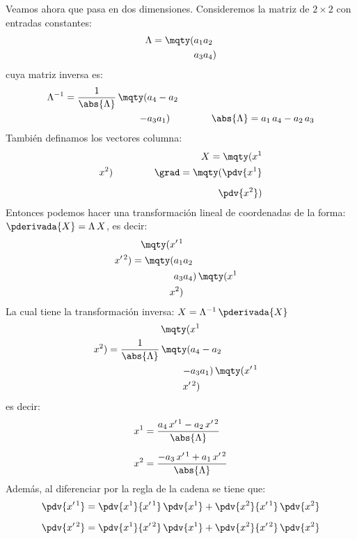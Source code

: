 Veamos ahora que pasa en dos dimensiones. Consideremos la matriz de $2 \times 2$ con entradas constantes:
\begin{align}
\Lambda = \mqty(a_{1} & a_{2} \\ a_{3} & a_{4})
\label{eq:ecuacion_10_004}   
\end{align}
cuya matriz inversa es:
\begin{align}
\Lambda^{-1} = \dfrac{1}{\abs{\Lambda}} \, \mqty(a_{4} & - a_{2} \\ - a_{3} & a_{1}) \hspace{1.5cm} \abs{\Lambda} = a_{1} \, a_{4} - a_{2} \, a_{3}
\label{eq:ecuacion_10_005}   
\end{align}
También definamos los vectores columna:
\begin{align}
X = \mqty(x^{1} \\ x^{2}) \hspace{1.5cm} \grad = \mqty(\displaystyle \pdv{x^{1}} \\[0.5em] \displaystyle \pdv{x^{2}})
\label{eq:ecuacion_10_006}   
\end{align}
Entonces podemos hacer una transformación lineal de coordenadas de la forma: $\pderivada{X} = \Lambda \, X$, es decir:
\begin{align}
\mqty(x^{\prime \, 1} \\ x^{\prime \, 2}) =
\mqty(a_{1} & a_{2} \\ a_{3} & a_{4}) \, \mqty(x^{1} \\ x^{2})
\label{eq:ecuacion_10_007}   
\end{align}
La cual tiene la transformación inversa: $X = \Lambda^{-1} \, \pderivada{X}$
\begin{align}
\mqty(x^{1} \\ x^{2}) = \dfrac{1}{\abs{\Lambda}} \, 
\mqty(a_{4} & - a_{2} \\ - a_{3} & a_{1}) \, \mqty(x^{\prime \, 1} \\ x^{\prime \, 2})
\label{eq:ecuacion_10_008}   
\end{align}
es decir:
\begin{align}
x^{1} &= \dfrac{a_{4} \, x^{\prime \, 1} - a_{2} \, x^{\prime \, 2}}{\abs{\Lambda}} \label{eq:ecuacion_10_009} \\[0.5em]
x^{2} &= \dfrac{-a_{3} \, x^{\prime \, 1} + a_{1} \, x^{\prime \, 2}}{\abs{\Lambda}} \label{eq:ecuacion_10_010}
\end{align}
Además, al diferenciar por la regla de la cadena se tiene que:
\begin{align}
\begin{aligned}
\pdv{x^{\prime \, 1}} &= \pdv{x^{1}}{x^{\prime \, 1}} \, \pdv{x^{1}} + \pdv{x^{2}}{x^{\prime \, 1}} \, \pdv{x^{2}} \\[0.5em]
\pdv{x^{\prime \, 2}} &= \pdv{x^{1}}{x^{\prime \, 2}} \, \pdv{x^{1}} + \pdv{x^{2}}{x^{\prime \, 2}} \, \pdv{x^{2}}
\end{aligned}
\label{eq:ecuacion_10_011}
\end{align}
